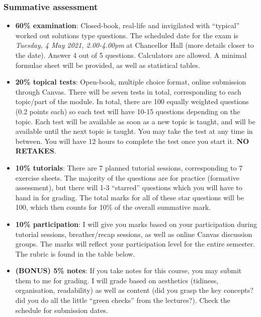 \documentclass[
]{book}
\theoremstyle{definition}
\theoremstyle{definition}
\theoremstyle{definition}
\theoremstyle{definition}
\theoremstyle{remark}
\begin{document}
\hypertarget{summative-assessment}{%
\subsubsection*{Summative assessment}\label{summative-assessment}}

\begin{itemize}
\item
  \textbf{60\% examination}: Closed-book, real-life and invigilated with ``typical'' worked out solutions type questions. The scheduled date for the exam is \emph{Tuesday, 4 May 2021, 2.00-4.00pm} at Chancellor Hall (more details closer to the date). Answer 4 out of 5 questions. Calculators are allowed. A minimal formulae sheet will be provided, as well as statistical tables.
\item
  \textbf{20\% topical tests}: Open-book, multiple choice format, online submission through Canvas. There will be seven tests in total, corresponding to each topic/part of the module. In total, there are 100 equally weighted questions (0.2 points each) so each test will have 10-15 questions depending on the topic. Each test will be available as soon as a new topic is taught, and will be available until the next topic is taught. You may take the test at any time in between. You will have 12 hours to complete the test once you start it. \textbf{NO RETAKES}.
\item
  \textbf{10\% tutorials}: There are 7 planned tutorial sessions, corresponding to 7 exercise sheets. The majority of the questions are for practice (formative assessment), but there will 1-3 ``starred'' questions which you will have to hand in for grading. The total marks for all of these star questions will be 100, which then counts for 10\% of the overall summative mark.
\item
  \textbf{10\% participation}: I will give you marks based on your participation during tutorial sessions, breather/recap sessions, as well as online Canvas discussion groups. The marks will reflect your participation level for the entire semester. The rubric is found in the table below.
\item
  \textbf{(BONUS) 5\% notes}: If you take notes for this course, you may submit them to me for grading. I will grade based on aesthetics (tidiness, organisation, readability) as well as content (did you grasp the key concepts? did you do all the little ``green checks'' from the lectures?). Check the schedule for submission dates.
\end{itemize}
\end{document}
